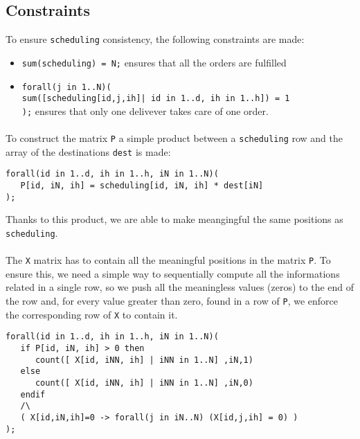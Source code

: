 \documentclass[10pt]{article}
\begin{document}
	\subsection{Constraints}

	To ensure \texttt{scheduling} consistency, the following constraints are made:
	\begin{itemize}
		\item \texttt{sum(scheduling) = N;} ensures that all the orders are fulfilled %
		\item \texttt{forall(j in 1..N)(\\
			sum([scheduling[id,j,ih]| id in 1..d, ih in 1..h]) = 1\\
		  );} ensures that only one delivever takes care of one order. 
	\end{itemize}

	\paragraph*{}
	To construct the matrix \texttt{P} a simple product between a \texttt{scheduling} row and the array of the destinations \texttt{dest} is
	made:
	\begin{verbatim}
forall(id in 1..d, ih in 1..h, iN in 1..N)(
   P[id, iN, ih] = scheduling[id, iN, ih] * dest[iN]
);
	\end{verbatim}
	
	Thanks to this product, we are able to make meangingful the same positions
	as \texttt{scheduling}.

	\paragraph*{}
	The \texttt{X} matrix has to contain all the meaningful	positions in the matrix
	\texttt{P}. To ensure this, we need a simple way to sequentially compute all the
	informations related in a single row, so we push all the meaningless values (zeros)
	to the end of the row and, for every value greater than zero, found in a row of
	\texttt{P}, we enforce the corresponding row of \texttt{X} to contain it.

	\begin{verbatim}
forall(id in 1..d, ih in 1..h, iN in 1..N)(
   if P[id, iN, ih] > 0 then
      count([ X[id, iNN, ih] | iNN in 1..N] ,iN,1) 
   else
      count([ X[id, iNN, ih] | iNN in 1..N] ,iN,0)
   endif
   /\
   ( X[id,iN,ih]=0 -> forall(j in iN..N) (X[id,j,ih] = 0) )
);
	\end{verbatim}
\end{document}
